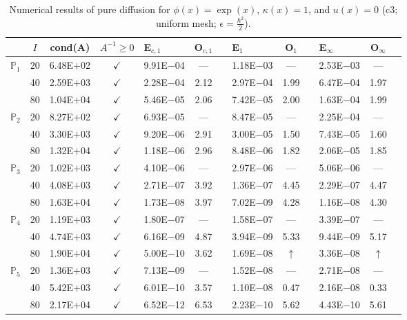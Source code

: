 \begin{table}[H]
\centering
\caption{Numerical results of pure diffusion for $\phi(x)=\exp(x)$, $\kappa(x)=1$, and $u(x)=0$ (c3; uniform mesh; $\epsilon=\frac{h^2}{2}$).}
\begin{tabular}{@{}l c c c l c c l c c l c c@{}}
\toprule
 & $I$ & cond(A) & $A^{-1}\geq 0$ &  E$_{c,1}$ & O$_{c,1}$ && E$_1$ & O$_1$ && E$_{\infty}$ & O$_{\infty}$\\
\midrule
\multirow{3}{*}{$\mathbb{P}_{1}$}
 & 20 & 6.48E$+$02 & $\checkmark$ & 9.91E$-$04 & --- && 1.18E$-$03 & --- && 2.53E$-$03 & ---\\
 & 40 & 2.59E$+$03 & $\checkmark$ & 2.28E$-$04 & 2.12 && 2.97E$-$04 & 1.99 && 6.47E$-$04 & 1.97\\
 & 80 & 1.04E$+$04 & $\checkmark$ & 5.46E$-$05 & 2.06 && 7.42E$-$05 & 2.00 && 1.63E$-$04 & 1.99\\
\midrule
\multirow{3}{*}{$\mathbb{P}_{2}$}
 & 20 & 8.27E$+$02 & $\checkmark$ & 6.93E$-$05 & --- && 8.47E$-$05 & --- && 2.25E$-$04 & ---\\
 & 40 & 3.30E$+$03 & $\checkmark$ & 9.20E$-$06 & 2.91 && 3.00E$-$05 & 1.50 && 7.43E$-$05 & 1.60\\
 & 80 & 1.32E$+$04 & $\checkmark$ & 1.18E$-$06 & 2.96 && 8.48E$-$06 & 1.82 && 2.06E$-$05 & 1.85\\
\midrule
\multirow{3}{*}{$\mathbb{P}_{3}$}
 & 20 & 1.02E$+$03 & $\checkmark$ & 4.10E$-$06 & --- && 2.97E$-$06 & --- && 5.06E$-$06 & ---\\
 & 40 & 4.08E$+$03 & $\checkmark$ & 2.71E$-$07 & 3.92 && 1.36E$-$07 & 4.45 && 2.29E$-$07 & 4.47\\
 & 80 & 1.63E$+$04 & $\checkmark$ & 1.73E$-$08 & 3.97 && 7.02E$-$09 & 4.28 && 1.16E$-$08 & 4.30\\
\midrule
\multirow{3}{*}{$\mathbb{P}_{4}$}
 & 20 & 1.19E$+$03 & $\checkmark$ & 1.80E$-$07 & --- && 1.58E$-$07 & --- && 3.39E$-$07 & ---\\
 & 40 & 4.74E$+$03 & $\checkmark$ & 6.16E$-$09 & 4.87 && 3.94E$-$09 & 5.33 && 9.44E$-$09 & 5.17\\
 & 80 & 1.90E$+$04 & $\checkmark$ & 5.00E$-$10 & 3.62 && 1.69E$-$08 & $\uparrow$ && 3.36E$-$08 & $\uparrow$\\
\midrule
\multirow{3}{*}{$\mathbb{P}_{5}$}
 & 20 & 1.36E$+$03 & $\checkmark$ & 7.13E$-$09 & --- && 1.52E$-$08 & --- && 2.71E$-$08 & ---\\
 & 40 & 5.42E$+$03 & $\checkmark$ & 6.01E$-$10 & 3.57 && 1.10E$-$08 & 0.47 && 2.16E$-$08 & 0.33\\
 & 80 & 2.17E$+$04 & $\checkmark$ & 6.52E$-$12 & 6.53 && 2.23E$-$10 & 5.62 && 4.43E$-$10 & 5.61\\
\bottomrule
\end{tabular}
\end{table}